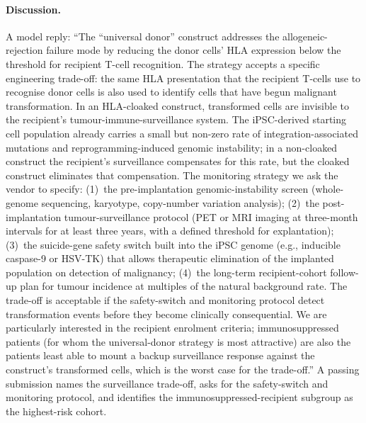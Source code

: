 \paragraph{Discussion.} A model reply: ``The ``universal donor''
construct addresses the allogeneic-rejection failure mode by
reducing the donor cells' HLA expression below the threshold for
recipient T-cell recognition. The strategy accepts a specific
engineering trade-off: the same HLA presentation that the
recipient T-cells use to recognise donor cells is also used to
identify cells that have begun malignant transformation. In an
HLA-cloaked construct, transformed cells are invisible to the
recipient's tumour-immune-surveillance system. The
iPSC-derived starting cell population already carries a small but
non-zero rate of integration-associated mutations
and reprogramming-induced genomic instability; in a non-cloaked
construct the recipient's surveillance compensates for this rate,
but the cloaked construct eliminates that compensation. The
monitoring strategy we ask the vendor to specify: (1)~the
pre-implantation genomic-instability screen (whole-genome
sequencing, karyotype, copy-number variation analysis); (2)~the
post-implantation tumour-surveillance protocol (PET or MRI imaging
at three-month intervals for at least three years, with a defined
threshold for explantation); (3)~the suicide-gene safety switch
built into the iPSC genome (e.g., inducible caspase-9 or HSV-TK)
that allows therapeutic elimination of the implanted population
on detection of malignancy; (4)~the long-term recipient-cohort
follow-up plan for tumour incidence at multiples of the natural
background rate. The trade-off is acceptable if the safety-switch
and monitoring protocol detect transformation events before they
become clinically consequential. We are particularly interested in
the recipient enrolment criteria; immunosuppressed patients (for
whom the universal-donor strategy is most attractive) are also
the patients least able to mount a backup surveillance response
against the construct's transformed cells, which is the worst
case for the trade-off.'' A passing submission names the
surveillance trade-off, asks for the safety-switch and monitoring
protocol, and identifies the immunosuppressed-recipient subgroup as
the highest-risk cohort.
